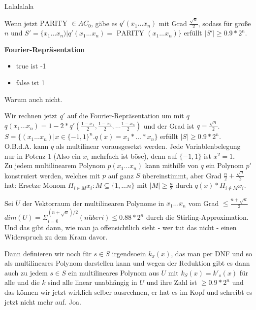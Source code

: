 \begin{beweis}
    Lalalalala

    Wenn jetzt $\text{PARITY } \in AC_0$, gäbe es $q'(x_1 \dots x_n)$ mit Grad
    $\frac{\sqrt{n}}{2}$, sodass für große $n$ und $S' = \{x_1 \dots x_n) |
        q'(x_1 \dots x_n) = \text{ PARITY }(x_1 \dots x_n) \}$ erfüllt $|S'|
        \geq 0.9 * 2^n$.


    \textbf{Fourier-Repräsentation}

    \begin{itemize}
        \item true ist -1
        \item false ist 1
    \end{itemize}
    Warum auch nicht.

    Wir rechnen jetzt $q'$ auf die Fourier-Repräsentation um mit $q$
    \\
    $q(x_1 \dots x_n) = 1 - 2 * q'(\frac{1-x_1}{2}, \frac{1-x_2}{2}, \dots
    \frac{1-x_n}{2})$ und der Grad ist $q = \frac{\sqrt{n}}{2}$.
    \\
    $S = \{(x_1 \dots x_n) | x \in \{-1,1\}^n . q(x) = x_1 * \dots * x_n \}$
    erfüllt $|S| \geq 0.9 * 2^n$.
    \\
    O.B.d.A. kann $q$ als multilinear vorausgesetzt werden.
    Jede Variablenbelegung nur in Potenz 1 (Also ein $x_i$ mehrfach ist böse),
    denn auf $\{-1, 1\}$ ist $x^2 = 1$.
    \\
    Zu jedem multilinearem Polynom $p(x_1 \dots x_n)$ kann mithilfe von $q$ ein
    Polynom $p'$ konstruiert werden, welches mit $p$ auf ganz $S$ übereinstimmt,
    aber Grad $\frac{n}{2} + \frac{\sqrt{n}}{2}$ hat:
    Ersetze Monom $\Pi_{i \in M} x_i: M \subseteq \{1, \dots n\}$ mit $|M| \geq
    \frac{n}{2}$ durch $q(x) * \Pi_{i \notin M} x_i$.


\end{beweis}



Sei $U$ der Vektorraum der multilinearen Polynome in $x_1 \dots x_n$ vom Grad
$\leq \frac{n + \sqrt{n}}{2}$
\\
$dim(U) = \Sigma_{i=0}^{(n+\sqrt{n})/2} (n über i) \leq 0.88 * 2^n$ durch die
Stirling-Approximation. Und das gibt dann, wie man ja offensichtlich sieht - wer
tut das nicht - einen Widerspruch zu dem Kram davor.

Dann definieren wir noch für $s \in S$ irgendsoein $k_x(x)$, das man per DNF und
so als multilineares Polynom darstellen kann und wegen der Reduktion gibt es
dann auch zu jedem $s \in S$ ein multilineares Polynom aus $U$ mit $k_S(x) =
k'_s(x)$ für alle und die $k$ sind alle linear unabhängig in $U$ und ihre Zahl
ist $\geq 0.9 * 2^n$ und das können wir jetzt wirklich selber ausrechnen, er hat
es im Kopf und schreibt es jetzt nicht mehr auf. Joa.












